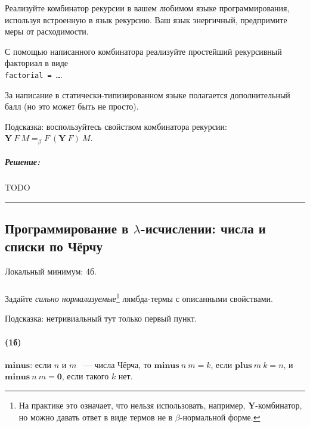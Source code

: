 \documentclass{article}
\newenvironment{proof}{\subparagraph{\hspace{-1em}Решение:\newline}}{\par\noindent\rule{\textwidth}{0.4pt}}
\newcommand{\comb}[1]{\mathbf{#1}}
\newcommand{\term}[1]{\mathbf{#1}}
\newcommand{\eqbeta}{=_\beta}
\renewcommand{\emph}[1]{{\color{blue} \textit{#1}}}
\begin{document}
    Реализуйте комбинатор рекурсии в вашем любимом языке программирования, используя встроенную в язык рекурсию.
    Ваш язык энергичный, предпримите меры от расходимости.

    С помощью написанного комбинатора реализуйте простейший рекурсивный факториал в виде \\ \texttt{factorial = \ldots}.

    За написание в статически-типизированном языке полагается дополнительный балл (но это может быть не просто).

    Подсказка: воспользуйтесь свойством комбинатора рекурсии: $\comb{Y}~F~M \eqbeta F~(\comb{Y}~F)~M$.

    \begin{proof}
        TODO %
    \end{proof}

    \subsection{Программирование в $\lambda$-исчислении: числа и списки по Чёрчу}

    Локальный минимум: 4б.

    \subsubsection{}

    Задайте \emph{сильно нормализуемые}\footnote{На практике это означает, что нельзя использовать, например, $\comb{Y}$-комбинатор, но можно давать ответ в виде термов не в $\beta$-нормальной форме.} лямбда-термы с описанными свойствами.

    Подсказка: нетривиальный тут только первый пункт.

    \paragraph{(1б)}

    $\term{minus}$: если $n$ и $m$ ~--- числа Чёрча, то $\term{minus}~n~m = k$,
    если $\term{plus}~m~k = n$, и $\term{minus}~n~m = \term{0}$, если такого $k$
    нет.
\end{document}
